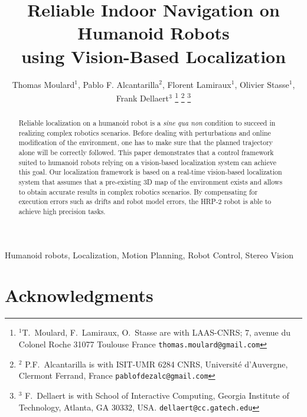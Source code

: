 \documentclass[a4paper, 10pt, conference]{ieeeconf}
\title{\LARGE \bf Reliable Indoor Navigation on Humanoid Robots\\
  using Vision-Based Localization}
\author{Thomas Moulard$^{1}$, Pablo F. Alcantarilla$^{2}$, Florent Lamiraux$^{1}$, Olivier Stasse$^{1}$, Frank Dellaert$^{3}$%
\thanks{$^{1} $T.\ Moulard, F.\ Lamiraux, O.\ Stasse are with LAAS-CNRS; 7, avenue du Colonel Roche 31077 Toulouse France {\tt\small thomas.moulard@gmail.com}}%
\thanks{$^{2}$ P.F.\ Alcantarilla is with ISIT-UMR 6284 CNRS, Universit\'e d'Auvergne, Clermont Ferrand, France {\tt\small pablofdezalc@gmail.com}}%
\thanks{$^{3}$ F.\ Dellaert is with School of Interactive Computing, Georgia Institute of Technology, Atlanta, GA 30332, USA. {\tt\small dellaert@cc.gatech.edu}}%
}
\begin{document}
\maketitle
\thispagestyle{empty}
\pagestyle{empty}


\begin{abstract}
Reliable localization on a humanoid robot is a \textit{sine qua non} condition to succeed in realizing complex robotics scenarios. Before dealing with perturbations and online modification of the environment, one has to make sure that the planned trajectory alone will be correctly followed. This paper demonstrates that a control framework suited to humanoid robots relying on a vision-based localization system can achieve this goal. Our localization framework is based on a real-time vision-based localization system that assumes that a pre-existing 3D map of the environment exists and allows to obtain accurate results in complex robotics scenarios. By compensating for execution errors such as drifts and robot model errors, the HRP-2 robot is able to achieve high precision tasks. 
\end{abstract}

\begin{keywords}
  Humanoid robots, Localization, Motion Planning, Robot Control, Stereo Vision
\end{keywords}








\section*{Acknowledgments}



\end{document}
